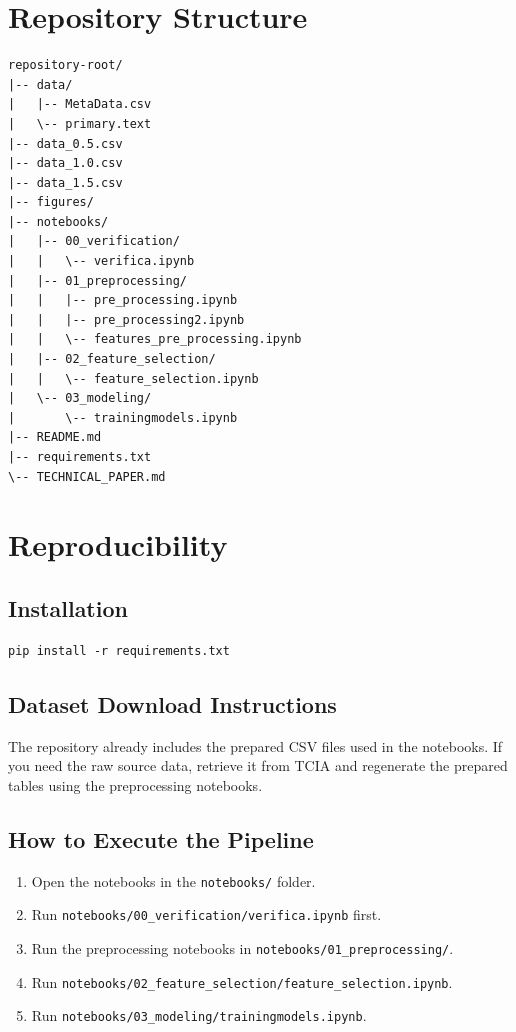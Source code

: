 \documentclass[11pt,a4paper]{article}
\begin{document}
\appendix
\section{Repository Structure}
\begin{verbatim}
repository-root/
|-- data/
|   |-- MetaData.csv
|   \-- primary.text
|-- data_0.5.csv
|-- data_1.0.csv
|-- data_1.5.csv
|-- figures/
|-- notebooks/
|   |-- 00_verification/
|   |   \-- verifica.ipynb
|   |-- 01_preprocessing/
|   |   |-- pre_processing.ipynb
|   |   |-- pre_processing2.ipynb
|   |   \-- features_pre_processing.ipynb
|   |-- 02_feature_selection/
|   |   \-- feature_selection.ipynb
|   \-- 03_modeling/
|       \-- trainingmodels.ipynb
|-- README.md
|-- requirements.txt
\-- TECHNICAL_PAPER.md
\end{verbatim}

\section{Reproducibility}
\subsection{Installation}
\begin{verbatim}
pip install -r requirements.txt
\end{verbatim}

\subsection{Dataset Download Instructions}
The repository already includes the prepared CSV files used in the notebooks. If you need the raw source data, retrieve it from TCIA and regenerate the prepared tables using the preprocessing notebooks.

\subsection{How to Execute the Pipeline}
\begin{enumerate}[leftmargin=*]
    \item Open the notebooks in the \texttt{notebooks/} folder.
    \item Run \texttt{notebooks/00\_verification/verifica.ipynb} first.
    \item Run the preprocessing notebooks in \texttt{notebooks/01\_preprocessing/}.
    \item Run \texttt{notebooks/02\_feature\_selection/feature\_selection.ipynb}.
    \item Run \texttt{notebooks/03\_modeling/trainingmodels.ipynb}.
\end{enumerate}
\end{document}
